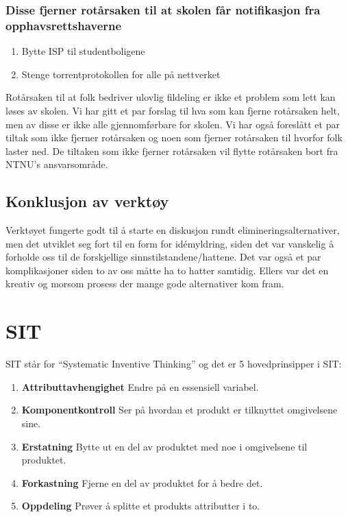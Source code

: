 \subsubsection*{Disse fjerner rotårsaken til at skolen får notifikasjon fra opphavsrettshaverne}
\begin{enumerate}
    \item Bytte ISP til studentboligene
    \item Stenge torrentprotokollen for alle på nettverket
\end{enumerate}
Rotårsaken til at folk bedriver ulovlig fildeling er ikke et problem som lett kan løses av skolen. Vi har gitt et par forslag til hva som kan fjerne rotårsaken helt, men av disse er ikke alle gjennomførbare for skolen. Vi har også foreslått et par tiltak som ikke fjerner rotårsaken og noen som fjerner rotårsaken til hvorfor folk laster ned. De tiltaken som ikke fjerner rotårsaken vil flytte rotårsaken bort fra NTNU's ansvarsområde.

\subsection{Konklusjon av verktøy}
Verktøyet fungerte godt til å starte en diskusjon rundt elimineringsalternativer, men det utviklet seg fort til en form for idémyldring, siden det var vanskelig å forholde oss til de forskjellige sinnstilstandene/hattene. Det var også et par komplikasjoner siden to av oss måtte ha to hatter samtidig. Ellers var det en kreativ og morsom prosess der mange gode alternativer kom fram. 

\section{SIT}
SIT står for ``Systematic Inventive Thinking'' og det er 5 hovedprinsipper i SIT: 
\begin{enumerate}
    \item \textbf{Attributtavhengighet} Endre på en essensiell variabel.
    \item \textbf{Komponentkontroll} Ser på hvordan et produkt er tilknyttet omgivelsene sine.
    \item \textbf{Erstatning} Bytte ut en del av produktet med noe i omgivelsene til produktet.
    \item \textbf{Forkastning} Fjerne en del av produktet for å bedre det.
    \item \textbf{Oppdeling} Prøver å splitte et produkts attributter i to.
\end{enumerate}
